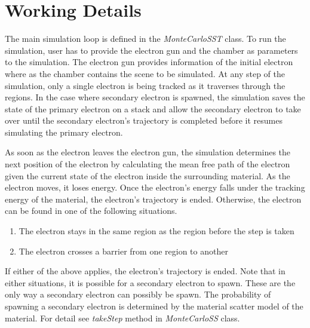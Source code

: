 \chapter{Working Details}

The main simulation loop is defined in the \textit{MonteCarloSST} class. To run the simulation, user has to provide the electron gun and the chamber as parameters to the simulation. The electron gun provides information of the initial electron where as the chamber contains the scene to be simulated. At any step of the simulation, only a single electron is being tracked as it traverses through the regions. In the case where secondary electron is spawned, the simulation saves the state of the primary electron on a stack and allow the secondary electron to take over until the secondary electron's trajectory is completed before it resumes simulating the primary electron. 

As soon as the electron leaves the electron gun, the simulation determines the next position of the electron by calculating the mean free path of the electron given the current state of the electron inside the surrounding material. As the electron moves, it loses energy. Once the electron's energy falls under the tracking energy of the material, the electron's trajectory is ended. Otherwise, the electron can be found in one of the following situations.

\begin{enumerate}
    \item The electron stays in the same region as the region before the step is taken
    \item The electron crosses a barrier from one region to another
\end{enumerate}

If either of the above applies, the electron's trajectory is ended. Note that in either situations, it is possible for a secondary electron to spawn. These are the only way a secondary electron can possibly be spawn. The probability of spawning a secondary electron is determined by the material scatter model of the material. For detail see \textit{takeStep} method in \textit{MonteCarloSS} class.
